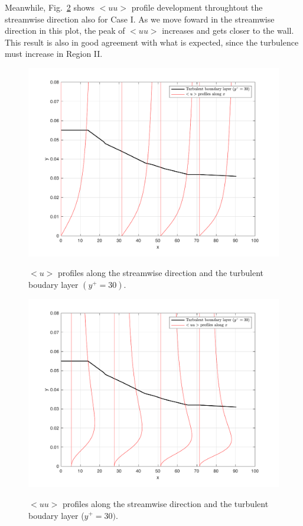 \documentclass[twocolumn,10pt]{asme2e}
\begin{document}
Meanwhile, Fig.~\ref{fig:uu_CI} shows \(<uu>\) profile development throughtout the streamwise direction also for Case I. As we move foward in the streamwise direction in this plot, the peak of \(<uu>\) increases and gets closer to the wall. This result is also in good agreement with what is expected, since the turbulence must increase in Region II.


\begin{figure}[t]
\centering
\scalebox{0.5}
{\includegraphics{u_CI.pdf}}
\caption{\(<u>\) profiles along the streamwise direction and the turbulent boudary layer \((y^+=30)\).}
\label{fig:u_CI}
\end{figure}

\begin{figure}[t]
\centering
\scalebox{0.5}
{\includegraphics{uu_CI.pdf}}
\caption{\(<uu>\) profiles along the streamwise direction and the turbulent boudary layer (\(y^+=30)\).}
\label{fig:uu_CI}
\end{figure}
\end{document}
